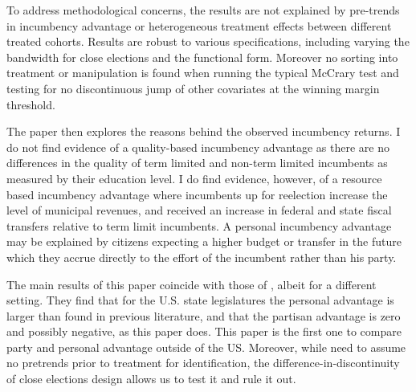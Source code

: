 \documentclass[12pt]{amsart}
\numberwithin{equation}{section}
\theoremstyle{definition}
\theoremstyle{definition}
\theoremstyle{definition}
\begin{document}
To address  methodological concerns, the results are not explained by pre-trends in incumbency advantage or heterogeneous treatment effects between different treated cohorts. Results are robust to various specifications, including varying the bandwidth for close elections and the functional form. Moreover no sorting into treatment or manipulation is found when running the typical McCrary test and testing for no discontinuous jump of other covariates at the winning margin threshold. 

The paper then explores the reasons behind the observed incumbency returns. I do not find evidence of a quality-based incumbency advantage as there are no differences in the quality of term limited and non-term limited incumbents as measured by their education level. I do find evidence, however, of a resource based incumbency advantage where incumbents up for reelection increase the level of municipal revenues, and received an increase in federal and state fiscal transfers relative to term limit incumbents. A personal incumbency advantage may be explained by citizens expecting a higher budget or transfer in the future which they accrue directly to the effort of the incumbent rather than his party. %

The main results of this paper coincide with those of \citet{fowler_hall_2014}, albeit for a different setting. They find that for the U.S. state legislatures the personal advantage is larger than found in previous literature, and that the partisan advantage is zero and possibly negative, as this paper does. This paper is the first one to compare party and personal advantage outside of the US. Moreover, while \citet{fowler_hall_2014} need to assume no pretrends prior to treatment for identification, the difference-in-discontinuity of close elections design allows us to test it and rule it out. 
\end{document}
